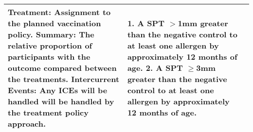 \documentclass{bmcart}
\begin{document}
\begin{table}[!ht]
\begin{tabular}{p{4cm}p{4cm}p{4cm}}
		\textbf{Treatment:} Assignment to the planned vaccination policy. \newline
		\textbf{Summary:} The relative proportion of participants with the outcome compared between the treatments. \newline
		\textbf{Intercurrent Events:} Any ICEs will be handled will be handled by the treatment policy approach.  &
		\textbf{1.} A SPT $>$1mm greater than the negative control to at least one allergen by approximately 12 months of age.\newline
		\textbf{2.} A SPT $\geq$3mm greater than the negative control to at least one allergen by approximately 12 months of age.
		\\
		\hline
	\end{tabular}
\end{table}
\end{document}
